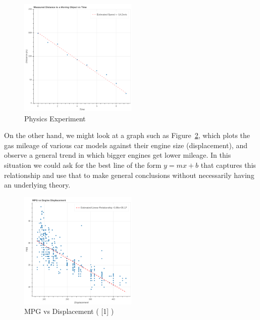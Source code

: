 \documentclass[
  11pt,
  letterpaper,
]{scrbook}
\theoremstyle{plain}
\theoremstyle{plain}
\theoremstyle{remark}
\begin{document}
\begin{figure}

{\centering \includegraphics[width=0.5\textwidth,height=\textheight]{chapters/img/distance-vs-time.png}

}

\caption{\label{fig-dvt}Physics Experiment}

\end{figure}

On the other hand, we might look at a graph such as
Figure~\ref{fig-mpg-vs-displacement}, which plots the gas mileage of
various car models against their engine size (displacement), and observe
a general trend in which bigger engines get lower mileage. In this
situation we could ask for the best line of the form \(y=mx+b\) that
captures this relationship and use that to make general conclusions
without necessarily having an underlying theory.

\begin{figure}

{\centering \includegraphics[width=0.5\textwidth,height=\textheight]{chapters/img/mpg-vs-displacement.png}

}

\caption{\label{fig-mpg-vs-displacement}MPG vs Displacement ( {[}1{]} )}

\end{figure}
\end{document}
